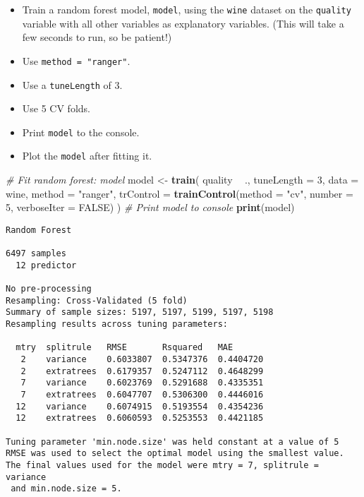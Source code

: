 \documentclass[
]{book}
\newenvironment{Shaded}{\begin{snugshade}}{\end{snugshade}}
\newcommand{\CommentTok}[1]{\textcolor[rgb]{0.56,0.35,0.01}{\textit{#1}}}
\newcommand{\DataTypeTok}[1]{\textcolor[rgb]{0.13,0.29,0.53}{#1}}
\newcommand{\DecValTok}[1]{\textcolor[rgb]{0.00,0.00,0.81}{#1}}
\newcommand{\KeywordTok}[1]{\textcolor[rgb]{0.13,0.29,0.53}{\textbf{#1}}}
\newcommand{\NormalTok}[1]{#1}
\newcommand{\OperatorTok}[1]{\textcolor[rgb]{0.81,0.36,0.00}{\textbf{#1}}}
\newcommand{\OtherTok}[1]{\textcolor[rgb]{0.56,0.35,0.01}{#1}}
\newcommand{\StringTok}[1]{\textcolor[rgb]{0.31,0.60,0.02}{#1}}
\begin{document}
\begin{itemize}
\item
  Train a random forest model, \texttt{model}, using the \texttt{wine} dataset on the \texttt{quality} variable with all other variables as explanatory variables. (This will take a few seconds to run, so be patient!)
\item
  Use \texttt{method\ =\ "ranger"}.
\item
  Use a \texttt{tuneLength} of 3.
\item
  Use 5 CV folds.
\item
  Print \texttt{model} to the console.
\item
  Plot the \texttt{model} after fitting it.
\end{itemize}

\begin{Shaded}
\begin{Highlighting}[]
\CommentTok{# Fit random forest: model}
\NormalTok{model <-}\StringTok{ }\KeywordTok{train}\NormalTok{(}
\NormalTok{  quality }\OperatorTok{~}\StringTok{ }\NormalTok{.,}
  \DataTypeTok{tuneLength =} \DecValTok{3}\NormalTok{,}
  \DataTypeTok{data =}\NormalTok{ wine, }\DataTypeTok{method =} \StringTok{"ranger"}\NormalTok{,}
  \DataTypeTok{trControl =} \KeywordTok{trainControl}\NormalTok{(}\DataTypeTok{method =} \StringTok{"cv"}\NormalTok{, }\DataTypeTok{number =} \DecValTok{5}\NormalTok{, }\DataTypeTok{verboseIter =} \OtherTok{FALSE}\NormalTok{)}
\NormalTok{)}
\CommentTok{# Print model to console}
\KeywordTok{print}\NormalTok{(model)}
\end{Highlighting}
\end{Shaded}

\begin{verbatim}
Random Forest 

6497 samples
  12 predictor

No pre-processing
Resampling: Cross-Validated (5 fold) 
Summary of sample sizes: 5197, 5197, 5199, 5197, 5198 
Resampling results across tuning parameters:

  mtry  splitrule   RMSE       Rsquared   MAE      
   2    variance    0.6033807  0.5347376  0.4404720
   2    extratrees  0.6179357  0.5247112  0.4648299
   7    variance    0.6023769  0.5291688  0.4335351
   7    extratrees  0.6047707  0.5306300  0.4446016
  12    variance    0.6074915  0.5193554  0.4354236
  12    extratrees  0.6060593  0.5253553  0.4421185

Tuning parameter 'min.node.size' was held constant at a value of 5
RMSE was used to select the optimal model using the smallest value.
The final values used for the model were mtry = 7, splitrule = variance
 and min.node.size = 5.
\end{verbatim}
\end{document}
